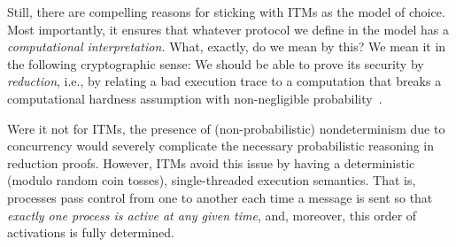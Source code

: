 Still, there are compelling reasons for sticking with ITMs as the model of
choice. Most importantly, it ensures that whatever protocol we define in the
model has a \emph{computational interpretation.} What, exactly, do we mean by
this? We mean it in the following cryptographic sense: We should be able to
prove its security by \emph{reduction}, i.e., by relating a bad execution trace
to a computation that breaks a computational hardness assumption with
non-negligible probability~\cite{lindell2014introduction}.

Were it not for ITMs, the presence of (non-probabilistic) nondeterminism due to
concurrency would severely complicate the necessary probabilistic reasoning in
reduction proofs. However, ITMs avoid this issue by having a deterministic
(modulo random coin tosses), single-threaded execution semantics. That is,
processes pass control from one to another each time a message is sent so that
\emph{exactly one process is active at any given time}, and, moreover, this
order of activations is fully determined.



